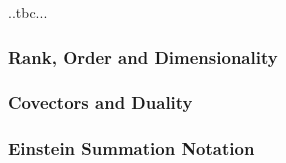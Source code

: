 ..tbc...


\subsubsection{Rank, Order and Dimensionality}


\subsubsection{Covectors and Duality}


\subsubsection{Einstein Summation Notation}
%




